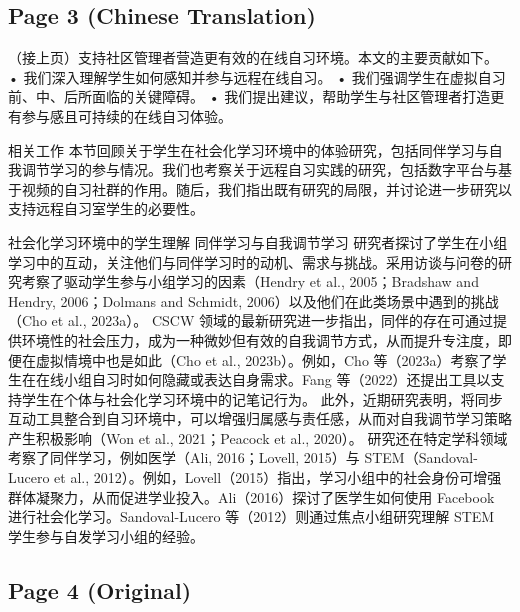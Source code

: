 \documentclass[12pt]{ctexart}
\begin{document}
\subsection*{Page 3 (Chinese Translation)}

（接上页）支持社区管理者营造更有效的在线自习环境。本文的主要贡献如下。
• 我们深入理解学生如何感知并参与远程在线自习。
• 我们强调学生在虚拟自习前、中、后所面临的关键障碍。
• 我们提出建议，帮助学生与社区管理者打造更有参与感且可持续的在线自习体验。

相关工作
本节回顾关于学生在社会化学习环境中的体验研究，包括同伴学习与自我调节学习的参与情况。我们也考察关于远程自习实践的研究，包括数字平台与基于视频的自习社群的作用。随后，我们指出既有研究的局限，并讨论进一步研究以支持远程自习室学生的必要性。

社会化学习环境中的学生理解
同伴学习与自我调节学习
研究者探讨了学生在小组学习中的互动，关注他们与同伴学习时的动机、需求与挑战。采用访谈与问卷的研究考察了驱动学生参与小组学习的因素（Hendry et al., 2005；Bradshaw and Hendry, 2006；Dolmans and Schmidt, 2006）以及他们在此类场景中遇到的挑战（Cho et al., 2023a）。
CSCW 领域的最新研究进一步指出，同伴的存在可通过提供环境性的社会压力，成为一种微妙但有效的自我调节方式，从而提升专注度，即便在虚拟情境中也是如此（Cho et al., 2023b）。例如，Cho 等（2023a）考察了学生在在线小组自习时如何隐藏或表达自身需求。Fang 等（2022）还提出工具以支持学生在个体与社会化学习环境中的记笔记行为。
此外，近期研究表明，将同步互动工具整合到自习环境中，可以增强归属感与责任感，从而对自我调节学习策略产生积极影响（Won et al., 2021；Peacock et al., 2020）。
研究还在特定学科领域考察了同伴学习，例如医学（Ali, 2016；Lovell, 2015）与 STEM（Sandoval-Lucero et al., 2012）。例如，Lovell（2015）指出，学习小组中的社会身份可增强群体凝聚力，从而促进学业投入。Ali（2016）探讨了医学生如何使用 Facebook 进行社会化学习。Sandoval-Lucero 等（2012）则通过焦点小组研究理解 STEM 学生参与自发学习小组的经验。

\subsection*{Page 4 (Original)}
\end{document}
